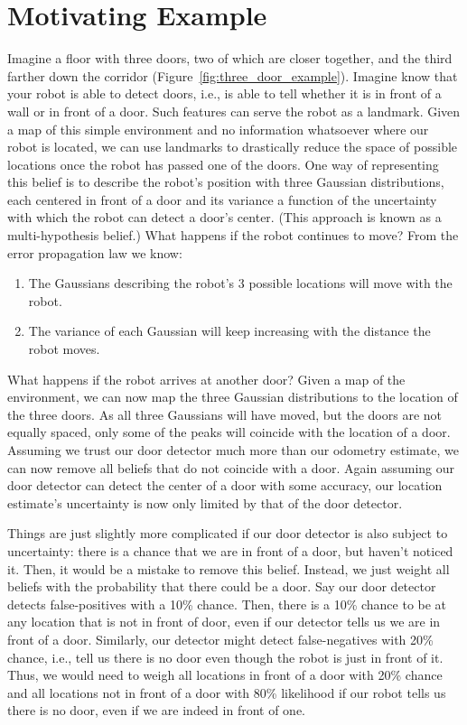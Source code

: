 \section{Motivating Example}
Imagine a floor with three doors, two of which are closer together, and the third farther down the corridor (Figure~\ref{fig:three_door_example}). Imagine know that your robot is able to detect doors, i.e., is able to tell whether it is in front of a wall or in front of a door. Such features can serve the robot as a landmark. Given a map of this simple environment and no information whatsoever where our robot is located, we can use landmarks to drastically reduce the space of possible locations once the robot has passed one of the doors. One way of representing this belief is to describe the robot's position with three Gaussian distributions, each centered in front of  a door and its variance a function of the uncertainty with which the robot can detect a door's center. (This approach is known as a multi-hypothesis belief.) What happens if the robot continues to move? From the error propagation law we know:
\begin{enumerate}
\item The Gaussians describing the robot's 3 possible locations will move with the robot.
\item The variance of each Gaussian will keep increasing with the distance the robot moves.
\end{enumerate}
What happens if the robot arrives at another door? Given a map of the environment, we can now map the three Gaussian distributions to the location of the three doors. As all three Gaussians will have moved, but the doors are not equally spaced, only some of the peaks will coincide with the location of  a door. Assuming we trust our door detector much more than our odometry estimate, we can now remove all beliefs that do not coincide with a door. Again assuming our door detector can detect the center of a door with some accuracy, our location estimate's uncertainty is now only limited by that of the door detector.


Things are just slightly more complicated if our door detector is also subject to uncertainty: there is a chance that we are in front of a door, but haven't noticed it. Then, it would be a mistake to remove this belief. Instead, we just weight all beliefs with the probability that there could be a door. Say our door detector detects false-positives with a 10\% chance. Then, there is a 10\% chance to be at any location that is not in front of door, even if our detector tells us we are in front of a door. Similarly, our detector might detect false-negatives with 20\% chance, i.e., tell us there is no door even though the robot is just in front of it. Thus, we would need to weigh all locations in front of a door with 20\% chance and all locations not in front of a door with 80\% likelihood if our robot tells us there is no door, even if we are indeed in front of one.

